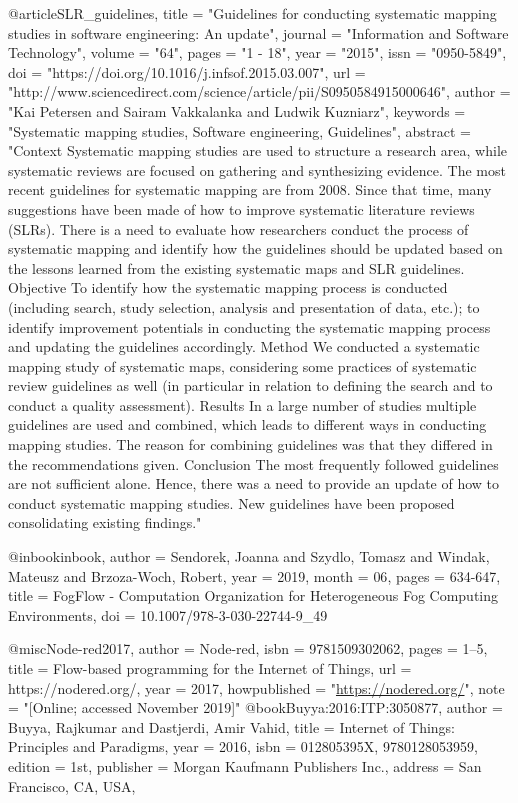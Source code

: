 @article{SLR_guidelines,
title = "Guidelines for conducting systematic mapping studies in software engineering: An update",
journal = "Information and Software Technology",
volume = "64",
pages = "1 - 18",
year = "2015",
issn = "0950-5849",
doi = "https://doi.org/10.1016/j.infsof.2015.03.007",
url = "http://www.sciencedirect.com/science/article/pii/S0950584915000646",
author = "Kai Petersen and Sairam Vakkalanka and Ludwik Kuzniarz",
keywords = "Systematic mapping studies, Software engineering, Guidelines",
abstract = "Context
Systematic mapping studies are used to structure a research area, while systematic reviews are focused on gathering and synthesizing evidence. The most recent guidelines for systematic mapping are from 2008. Since that time, many suggestions have been made of how to improve systematic literature reviews (SLRs). There is a need to evaluate how researchers conduct the process of systematic mapping and identify how the guidelines should be updated based on the lessons learned from the existing systematic maps and SLR guidelines.
Objective
To identify how the systematic mapping process is conducted (including search, study selection, analysis and presentation of data, etc.); to identify improvement potentials in conducting the systematic mapping process and updating the guidelines accordingly.
Method
We conducted a systematic mapping study of systematic maps, considering some practices of systematic review guidelines as well (in particular in relation to defining the search and to conduct a quality assessment).
Results
In a large number of studies multiple guidelines are used and combined, which leads to different ways in conducting mapping studies. The reason for combining guidelines was that they differed in the recommendations given.
Conclusion
The most frequently followed guidelines are not sufficient alone. Hence, there was a need to provide an update of how to conduct systematic mapping studies. New guidelines have been proposed consolidating existing findings."
}


@inbook{inbook,
    author = {Sendorek, Joanna and Szydlo, Tomasz and Windak, Mateusz and Brzoza-Woch, Robert},
    year = {2019},
    month = {06},
    pages = {634-647},
    title = {FogFlow - Computation Organization for Heterogeneous Fog Computing Environments},
    doi = {10.1007/978-3-030-22744-9_49}
}

@misc{Node-red2017,
    author = {Node-red},
    isbn = {9781509302062},
    pages = {1--5},
    title = {{Flow-based programming for the Internet of Things}},
    url = {https://nodered.org/},
    year = {2017},
    howpublished = "\url{https://nodered.org/}",
    note = "[Online; accessed November 2019]"
}
@book{Buyya:2016:ITP:3050877,
 author = {Buyya, Rajkumar and Dastjerdi, Amir Vahid},
 title = {Internet of Things: Principles and Paradigms},
 year = {2016},
 isbn = {012805395X, 9780128053959},
 edition = {1st},
 publisher = {Morgan Kaufmann Publishers Inc.},
 address = {San Francisco, CA, USA},
} 